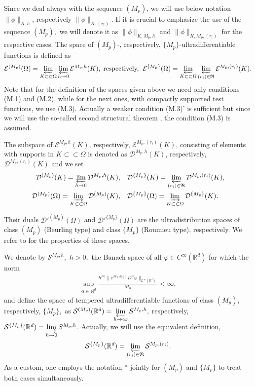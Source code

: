 \documentclass[sn-mathphys,Numbered]{sn-jnl}%
\theoremstyle{thmstyleone}%
\theoremstyle{thmstyletwo}%
\theoremstyle{thmstylethree}%
\begin{document}
Since we deal always with the sequence $(M_p)$, we will use below notation $\|\phi\|_{K,h}$, respectively $\|\phi\|_{K,(r_i)}$.  If it is crucial to emphasize the use of the sequence $(M_p),$ we will denote it as $\|\phi\|_{K,M_p,h}$ and  $\|\phi\|_{K,M_p,(r_i)}$ for the respective cases. The space of $(M_p)$-, respectively,  $\{M_p\}$-ultradifferentiable functions is defined as
\begin{equation*}
\mathcal{E}^{(M_p)}(\Omega)=\varprojlim_{K\subset\subset\Omega}\varprojlim_{h\to 0}\mathcal{E}^{M_p,h}(K),\; \text{respectively, }\;
\mathcal{E}^{\{M_p\}}(\Omega)=\varprojlim_{K\subset\subset\Omega}\varprojlim_{(r_i)\in\mathfrak R}\mathcal{E}^{M_p,(r_i)}(K).
\end{equation*}
Note that for the definition of the spaces given above we need only conditions (M.1) and (M.2), while for the next ones, with compactly supported test functions, we use (M.3).  Actually a weaker condition (M.3)' is sufficient but since we will use the so-called second structural theorem \cite[p.~91]{Komatsu1}, the condition (M.3) is assumed.

The subspace of $\mathcal{E}^{M_p,h}(K)$, respectively, $\mathcal{E}^{M_p,(r_i)}(K)$, consisting of elements with supports in $K\subset\subset\Omega$ is denoted as $\mathcal{D}^{M_p,h}(K)$, respectively, $\mathcal{D}^{M_p,(r_i)}(K)$ and we set
\begin{align*}
\mathcal{D}^{(M_p)}(K)=\varprojlim_{h\to 0}\mathcal{D}^{M_p,h}(K),&\quad 
\mathcal{D}^{\{M_p\}}(K)=\varprojlim_{(r_i)\in\mathfrak{R}}\mathcal{D}^{M_p,(r_i)}(K),
\\
\mathcal{D}^{(M_p)}(\Omega)=\varinjlim_{K\subset\subset\Omega}\mathcal{D}^{(M_p)}(K),&\quad 
\mathcal{D}^{\{M_p\}}(\Omega)=\varinjlim_{K\subset\subset\Omega}\mathcal{D}^{\{M_p\}}(K).
\end{align*}

Their duals $\mathcal{D}'^{(M_p)}(\Omega)$ and $\mathcal{D}'^{\{M_p\}}(\Omega)$ are the ultradistribution spaces of class $(M_p)$ (Beurling type) and class $\{M_p\}$ (Roumieu type), respectively. We refer to \cite{Komatsu1,Komatsu2,KMMP} for the properties of these spaces. 

We denote by $\mathcal{S}^{M_p,h},$ $h>0,$ the Banach space of all $\varphi\in C^\infty(\mathbb{R}^d)$ for which the norm
\begin{align*}
\sup_{\alpha\in \mathbb{N}^d}\frac{h^{|\alpha|}\|e^{M(h|\cdot|)}D^\alpha\varphi\|_{L^\infty(\mathbb{R}^d)}}{M_\alpha}<\infty,
\end{align*}
and define the space of tempered ultradifferentiable functions of class $(M_p),$ respectively, $\{M_p\},$ as  $\mathcal{S}^{(M_p)}(\mathbb{R}^d)=\varprojlim\limits_{h\to \infty}S^{M_p,h},$ respectively, $\mathcal{S}^{\{M_p\}}(\mathbb{R}^d)=\varinjlim\limits_{h\to 0}S^{M_p,h}.$ 
Actually, we will use the equivalent definition,
\begin{equation*}
    \mathcal{S}^{\{M_p\}}(\mathbb R^d)=\varprojlim_{(r_i)\in\mathfrak{R}}\mathcal{S}^{M_p,(r_i)}.
\end{equation*}
As a custom, one employs the notation $*$ jointly for $(M_p)$ and $\{M_p\}$ to treat both cases simultaneously. 
\end{document}
